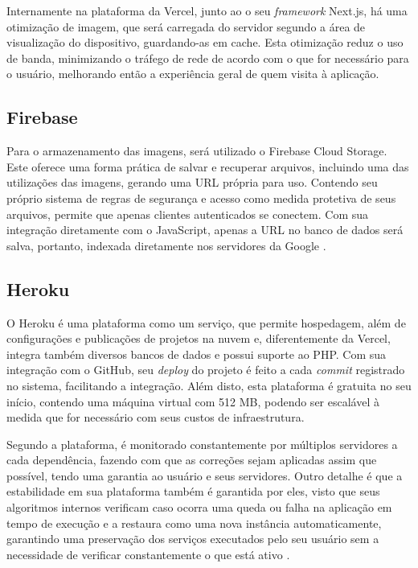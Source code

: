 Internamente na plataforma da Vercel, junto ao o seu \textit{framework} Next.js, há uma otimização de imagem, que será carregada do servidor segundo a área de visualização do dispositivo, guardando-as em cache. Esta otimização reduz o uso de banda, minimizando o tráfego de rede de acordo com o que for necessário para o usuário, melhorando então a experiência geral de quem visita à aplicação.

\subsection{Firebase}
Para o armazenamento das imagens, será utilizado o Firebase Cloud Storage. Este oferece uma forma prática de salvar e recuperar arquivos, incluindo uma das utilizações das imagens, gerando uma URL própria para uso. Contendo seu próprio sistema de regras de segurança e acesso como medida protetiva de seus arquivos, permite que apenas clientes autenticados se conectem. Com sua integração diretamente com o JavaScript, apenas a URL no banco de dados será salva, portanto, indexada diretamente nos servidores da Google \cite{FIREBASE}.

\subsection{Heroku}
O Heroku é uma plataforma como um serviço, que permite hospedagem, além de configurações e publicações de projetos na nuvem e, diferentemente da Vercel, integra também diversos bancos de dados e possui suporte ao PHP. Com sua integração com o GitHub, seu \textit{deploy} do projeto é feito a cada \textit{commit} registrado no sistema, facilitando a integração. Além disto, esta plataforma é gratuita no seu início, contendo uma máquina virtual com 512 MB, podendo ser escalável à medida que for necessário com seus custos de infraestrutura. 

Segundo a plataforma, é monitorado constantemente por múltiplos servidores a cada dependência, fazendo com que as correções sejam aplicadas assim que possível, tendo uma garantia ao usuário e seus servidores.  Outro detalhe é que a estabilidade em sua plataforma também é garantida por eles, visto que seus algoritmos internos verificam caso ocorra uma queda ou falha na aplicação em tempo de execução e a restaura como uma nova instância automaticamente, garantindo uma preservação dos serviços executados pelo seu usuário sem a necessidade de verificar constantemente o que está ativo \cite{HEROKU}.


